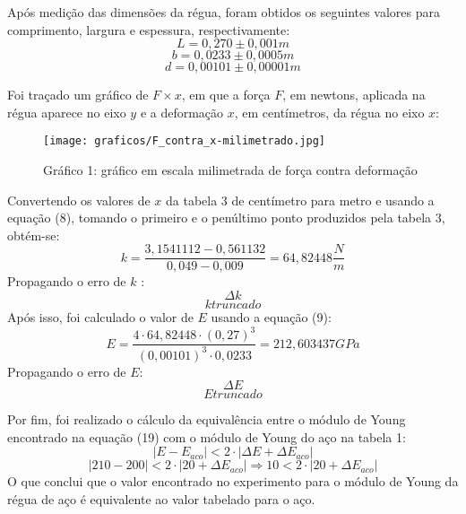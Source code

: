 \documentclass{article}
\begin{document}
Após medição das dimensões da régua, foram obtidos os seguintes valores para comprimento, largura e espessura, respectivamente:
\begin{equation}
    L = 0,270 \pm 0,001 m    
\end{equation}
\begin{equation}
    b = 0,0233 \pm 0,0005 m
\end{equation}
\begin{equation}
    d = 0,00101 \pm 0,00001 m
\end{equation}

Foi traçado um gráfico de $F \times x$, em que a força $F$, em newtons, aplicada na régua aparece no eixo $y$ e a deformação $x$, em centímetros, da régua no eixo $x$: 

\begin{figure}[!h]
    \centering
    \caption{Gráfico 1: gráfico em escala milimetrada de força contra deformação}
    \texttt{[image: graficos/F\_contra\_x-milimetrado.jpg]}
    \label{fig:fcontrax}
\end{figure}

Convertendo os valores de $x$ da tabela 3 de centímetro para metro e usando a equação (8), tomando o primeiro e o penúltimo ponto produzidos pela tabela 3, obtém-se:
\begin{equation}
    k = \frac{3,1541112 - 0,561132}{0,049 - 0,009} = 64,82448 \frac{N}{m}
\end{equation}
Propagando o erro de $k$ :
\begin{equation}
    \Delta k
\end{equation}
\begin{equation}
    k truncado
\end{equation}
Após isso, foi calculado o valor de $E$ usando a equação (9):
\begin{equation}
    E = \frac{4\cdot 64,82448 \cdot (0,27)^3}{(0,00101)^3\cdot 0,0233} = 212,603437 GPa
\end{equation}
Propagando o erro de $E$: 
\begin{equation}
    \Delta E
\end{equation}
\begin{equation}
    E truncado
\end{equation}

Por fim, foi realizado o cálculo da equivalência entre o módulo de Young encontrado na equação (19) com o módulo de Young do aço na tabela 1:
\begin{equation}
    |E - E_{aco}| < 2\cdot |\Delta E + \Delta E_{aco}|
\end{equation}
\[
    |210 - 200| < 2\cdot|20 + \Delta E_{aco}| \Rightarrow
    10 < 2\cdot|20 + \Delta E_{aco}|
\]
O que conclui que o valor encontrado no experimento para o módulo de Young da régua de aço é equivalente ao valor tabelado para o aço.
\end{document}
